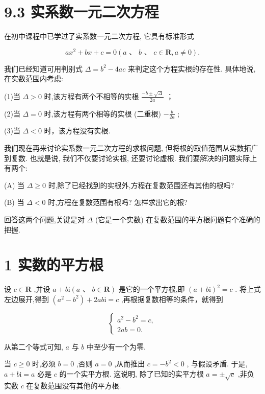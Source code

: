 \documentclass[10pt]{article}
\begin{document}
\section*{9.3 实系数一元二次方程}

在初中课程中已学过了实系数一元二次方程, 它具有标准形式

\[
a{x}^{2} + {bx} + c = 0\left( {a\text{ 、 }b\text{ 、 }c \in  \mathbf{R},a \neq  0}\right) .
\]

我们已经知道可用判别式 \(\Delta  = {b}^{2} - {4ac}\) 来判定这个方程实根的存在性. 具体地说, 在实数范围内考虑:

(1)当 \(\Delta  > 0\) 时,该方程有两个不相等的实根 \(\frac{-b \pm  \sqrt{\Delta }}{2a}\) ；

(2)当 \(\Delta  = 0\) 时,该方程有两个相等的实根 (二重根) \(- \frac{b}{2a}\) ;

(3)当 \(\Delta  < 0\) 时，该方程没有实根.

我们现在再来讨论实系数一元二次方程的求根问题, 但将根的取值范围从实数拓广到复数. 也就是说, 我们不仅要讨论实根, 还要讨论虚根. 我们要解决的问题实际上有两个:

(A) 当 \(\Delta  \geq  0\) 时,除了已经找到的实根外,方程在复数范围还有其他的根吗?

(B) 当 \(\Delta  < 0\) 时,方程在复数范围有根吗? 怎样求出它的根?

回答这两个问题,关键是对 \(\Delta\) (它是一个实数) 在复数范围的平方根问题有个准确的把握.

\section*{1 实数的平方根}

设 \(c \in  \mathbf{R}\) ,并设 \(a + b\mathrm{i}\left( {a\text{ 、 }b \in  \mathbf{R}}\right)\) 是它的一个平方根,即 \({\left( a + b\mathrm{i}\right) }^{2} = c\) . 将上式左边展开,得到 \(\left( {{a}^{2} - {b}^{2}}\right)  + {2ab}\mathrm{i} = c\) ,再根据复数相等的条件，就得到

\[
\left\{  \begin{array}{l} {a}^{2} - {b}^{2} = c, \\  {2ab} = 0. \end{array}\right.
\]

从第二个等式可知, \(a\) 与 \(b\) 中至少有一个为零.

当 \(c \geq  0\) 时,必须 \(b = 0\) ,否则 \(a = 0\) ,从而推出 \(c =  - {b}^{2} < 0\) , 与假设矛盾. 于是, \(a + b\mathrm{i} = a\) 必是 \(c\) 的一个实平方根. 这说明, 除了已知的实平方根 \(a =  \pm  \sqrt{c}\) ,非负实数 \(c\) 在复数范围没有其他的平方根.
\end{document}
